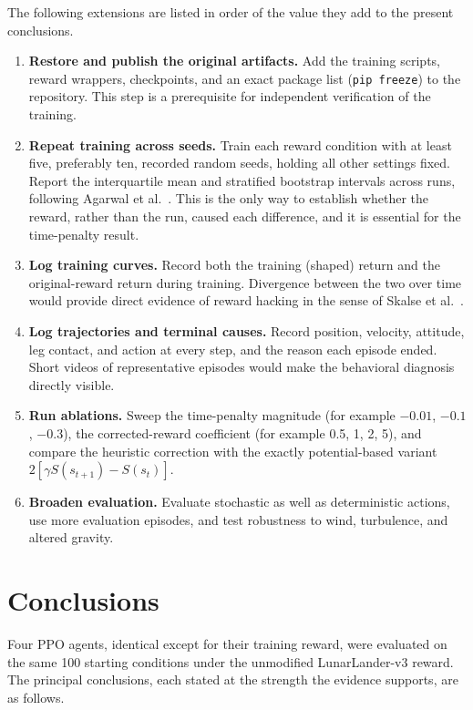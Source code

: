 \documentclass[11pt,a4paper]{article}
\begin{document}
The following extensions are listed in order of the value they add to the present conclusions.
\begin{enumerate}
  \item \textbf{Restore and publish the original artifacts.} Add the training scripts, reward wrappers, checkpoints, and an exact package list (\texttt{pip freeze}) to the repository. This step is a prerequisite for independent verification of the training.
  \item \textbf{Repeat training across seeds.} Train each reward condition with at least five, preferably ten, recorded random seeds, holding all other settings fixed. Report the interquartile mean and stratified bootstrap intervals across runs, following Agarwal et al.\ \cite{agarwal2021}. This is the only way to establish whether the reward, rather than the run, caused each difference, and it is essential for the time-penalty result.
  \item \textbf{Log training curves.} Record both the training (shaped) return and the original-reward return during training. Divergence between the two over time would provide direct evidence of reward hacking in the sense of Skalse et al.\ \cite{skalse2022}.
  \item \textbf{Log trajectories and terminal causes.} Record position, velocity, attitude, leg contact, and action at every step, and the reason each episode ended. Short videos of representative episodes would make the behavioral diagnosis directly visible.
  \item \textbf{Run ablations.} Sweep the time-penalty magnitude (for example $-0.01$, $-0.1$, $-0.3$), the corrected-reward coefficient (for example 0.5, 1, 2, 5), and compare the heuristic correction with the exactly potential-based variant $2[\gamma S(s_{t+1})-S(s_t)]$.
  \item \textbf{Broaden evaluation.} Evaluate stochastic as well as deterministic actions, use more evaluation episodes, and test robustness to wind, turbulence, and altered gravity.
\end{enumerate}

\section{Conclusions}\label{sec:conclusions}

Four PPO agents, identical except for their training reward, were evaluated on the same 100 starting conditions under the unmodified LunarLander-v3 reward. The principal conclusions, each stated at the strength the evidence supports, are as follows.
\end{document}
